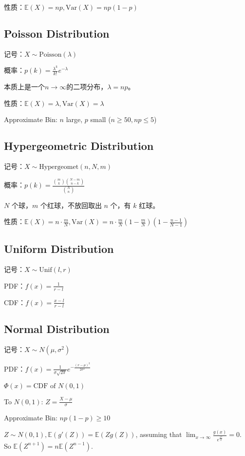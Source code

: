 \documentclass[9pt,landscape]{article}
\begin{document}
\begin{multicols}{3}
性质：$\mathbb{E}(X)=np,\text{Var}(X)=np(1-p)$

\subsection{Poisson Distribution}

记号：$X \sim \text{Poisson}(\lambda)$

概率：$p(k)=\frac{\lambda^k}{k!}e^{-\lambda}$

本质上是一个$n\to\infty$的二项分布，$\lambda=np$。

性质：$\mathbb{E}(X)=\lambda,\text{Var}(X)=\lambda$

Approximate Bin: $n$ large, $p$ small ($n \ge 50, np \le 5$)

\subsection{Hypergeometric Distribution}

记号：$X \sim \text{Hypergeomet}(n, N, m)$

概率：$p(k)=\frac{\binom{m}{k}\binom{N-m}{n-k}}{\binom{N}{n}}$

$N$ 个球，$m$ 个红球，不放回取出 $n$ 个，有 $k$ 红球。

性质：$\mathbb{E}(X)=n\cdot\frac{m}{N}, \mathrm{Var}(X)=n\cdot \frac{m}{N}\left(1-\frac{m}{N}\right)\left(1-\frac{n-1}{N-1}\right)$

\subsection{Uniform Distribution}

记号：$X \sim \mathrm{Unif}(l, r)$

PDF：$f(x)=\frac{1}{r-l}$

CDF：$f(x)=\frac{x-l}{r-l}$

\subsection{Normal Distribution}

记号：$X \sim N\left(\mu, \sigma^2\right)$

PDF：$f(x)=\frac{1}{\sigma\sqrt{2\pi}}e^{-\frac{\left(x-\mu\right)^2}{2\sigma^2}}$

$\Phi(x)=\text{CDF of $N(0, 1)$}$

To $N(0, 1)$: $Z = \frac{X - \mu}{\sigma}$

Approximate Bin: $np(1-p)\ge 10$

$Z\sim N(0, 1), \mathbb{E}(g'(Z))=\mathbb{E}(Zg(Z))$,  assuming that $\lim_{x\to \infty}\frac{g(x)}{e^{\frac{x^2}{2}}}=0$. So $\mathbb{E}(Z^{n+1})=n\mathbb{E}(Z^{n-1})$.


\end{multicols}
\end{document}
